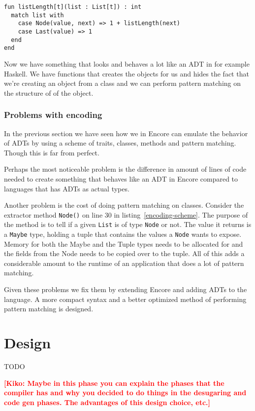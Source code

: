 \documentclass[10pt]{report}
\newcommand{\KIKO}[1]{\textcolor{red}{\textbf{[Kiko: #1]}}}
\def\code#1{\texttt{#1}} %
\begin{document}
\begin{lstlisting}[language=encore,caption={Function that uses pattern matching to calculate the length of a list}]
fun listLength[t](list : List[t]) : int
  match list with
    case Node(value, next) => 1 + listLength(next)
    case Last(value) => 1
  end
end
\end{lstlisting}

\par{Now we have something that looks and behaves a lot like an ADT in for example Haskell. We have functions that creates the objects for us and hides the fact that we're creating an object from a class and we can perform pattern matching on the structure of of the object.}

\subsection{Problems with encoding} \label{problems}
\par{In the previous section we have seen how we in Encore can emulate the behavior of ADTs by using a scheme of traits, classes, methods and pattern matching. Though this is far from perfect.}
\par{Perhaps the most noticeable problem is the difference in amount of lines of code needed to create something that behaves like an ADT in Encore compared to languages that has ADTs as actual types.}
\par{Another problem is the cost of doing pattern matching on classes. Consider the extractor method \code{Node()} on line 30 in listing~\ref{encoding-scheme}. The purpose of the method is to tell if a given \code{List} is of type \code{Node} or not. The value it returns is a \code{Maybe} type, holding a tuple that contains the values a \code{Node} wants to expose. Memory for both the Maybe and the Tuple types needs to be allocated for and the fields from the Node needs to be copied over to the tuple. All of this adds a considerable amount to the runtime of an application that does a lot of pattern matching.}
\par{Given these problems we fix them by extending Encore and adding ADTs to the language. A more compact syntax and a better optimized method of performing pattern matching is designed.}
\chapter{Design}
TODO

\KIKO{Maybe in this phase you can explain the phases that the compiler has and
  why you decided to do things in the desugaring and code gen phases. The advantages
of this design choice, etc.}
\end{document}
